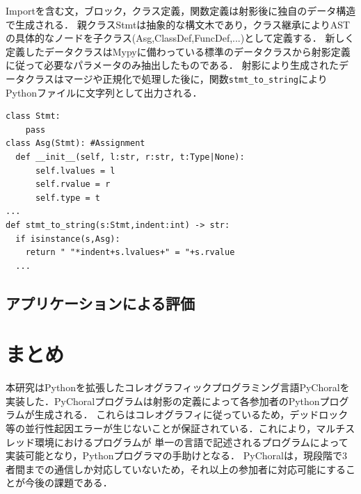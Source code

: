 \documentclass{resume}
\begin{document}
Importを含む文，ブロック，クラス定義，関数定義は射影後に独自のデータ構造で生成される．
親クラス\textsf{Stmt}は抽象的な構文木であり，クラス継承によりASTの具体的なノードを子クラス(\textsf{Asg,ClassDef,FuncDef,...})として定義する．
新しく定義したデータクラスはMypyに備わっている標準のデータクラスから射影定義に従って必要なパラメータのみ抽出したものである．
射影により生成されたデータクラスはマージや正規化で処理した後に，関数\texttt{stmt\_to\_string}によりPythonファイルに文字列として出力される．
\begin{lstlisting}[caption=data.py,label=data]
class Stmt:
    pass
class Asg(Stmt): #Assignment
  def __init__(self, l:str, r:str, t:Type|None):
      self.lvalues = l
      self.rvalue = r
      self.type = t
... 
def stmt_to_string(s:Stmt,indent:int) -> str:
  if isinstance(s,Asg):
    return " "*indent+s.lvalues+" = "+s.rvalue
  ... 
\end{lstlisting}

\subsection{アプリケーションによる評価}

\section{まとめ}
本研究はPythonを拡張したコレオグラフィックプログラミング言語PyChoralを実装した．PyChoralプログラムは射影の定義によって各参加者のPythonプログラムが生成される．
これらはコレオグラフィに従っているため，デッドロック等の並行性起因エラーが生じないことが保証されている．これにより，マルチスレッド環境におけるプログラムが
単一の言語で記述されるプログラムによって実装可能となり，Pythonプログラマの手助けとなる．
PyChoralは，現段階で3者間までの通信しか対応していないため，それ以上の参加者に対応可能にすることが今後の課題である．


\end{document}
